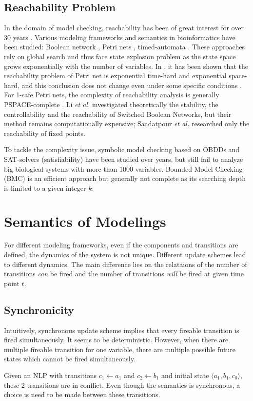 \subsection{Reachability Problem}
In the domain of model checking, reachability has been of great interest for over 30 years \cite{clarke2008birth,clarke20142}. 
Various modeling frameworks and semantics in bioinformatics have been studied: Boolean network \cite{akutsu2007control}, Petri nets \cite{mayr1984,esparza1998}, timed-automata \cite{Daws1998,wozna2003}. 
These approaches rely on global search and thus face state explosion problem as the state space grows exponentially with the number of variables. 
In \cite{peterson1977petri}, it has been shown that the reachability problem of Petri net is exponential time-hard and exponential space-hard, and this conclusion does not change even under some specific conditions \cite{esparza1998}. 
For 1-safe Petri nets, the complexity of reachability analysis is generally PSPACE-complete \cite{cheng1995complexity}.
Li \textit{et al.} \cite{li2012reachability,li2014stability} investigated theoretically the stability, the controllability and the reachability of Switched Boolean Networks, but their method remains computationally expensive;
Saadatpour \textit{et al.} \cite{saadatpour2010attractor} researched only the reachability of fixed points.

To tackle the complexity issue, symbolic model checking \cite{burch1992symbolic} based on OBDDs and SAT-solvers (satisfiability) \cite{abdulla2000symbolic} have been studied over years, but still fail to analyze big biological systems with more than $1000$ variables. 
Bounded Model Checking (BMC) \cite{clarke2001bounded} is an efficient approach but generally not complete as its searching depth is limited to a given integer $k$.
\section{Semantics of Modelings}
For different modeling frameworks, even if the components and transitions are defined, the dynamics of the system is not unique. 
Different update schemes lead to different dynamics.
The main difference lies on the relataions of the number of transitions \textit{can} be fired and the number of transitions \textit{will} be fired at given time point $t$.


\subsection{Synchronicity}
Intuitively, synchronous update scheme implies that every fireable transition is fired simultaneously.
It seems to be deterministic. 
However, when there are multiple fireable transition for one variable, there are multiple possible future states which cannot be fired simultaneously.
\begin{example}
Given an NLP with transitions $c_1\gets a_1$ and $c_2\gets b_1$ and initial state $\langle a_1, b_1, c_0\rangle$, these 2 transitions are in conflict.
Even though the semantics is synchronous, a choice is need to be made between these transitions.
\end{example}


